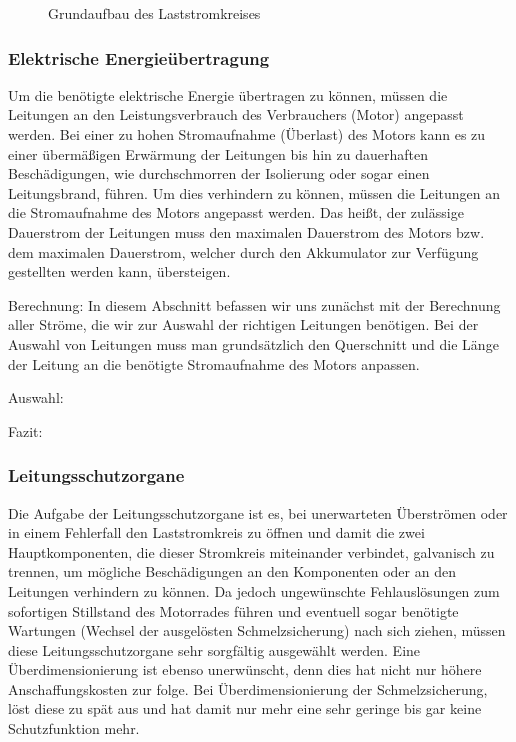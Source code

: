 \begin{figure}[H]
	\begin{center}
		\caption{Grundaufbau des Laststromkreises}
	\end{center}
\end{figure}

\newpage



\subsubsection{Elektrische Energieübertragung}
Um die benötigte elektrische Energie übertragen zu können, müssen die Leitungen an den Leistungsverbrauch des Verbrauchers (Motor) angepasst werden. Bei einer zu hohen Stromaufnahme (Überlast) des Motors kann es zu einer übermäßigen Erwärmung der Leitungen bis hin zu dauerhaften Beschädigungen, wie durchschmorren der Isolierung oder sogar einen Leitungsbrand, führen. Um dies verhindern zu können, müssen die Leitungen an die Stromaufnahme des Motors angepasst werden. Das heißt, der zulässige Dauerstrom der Leitungen muss den maximalen Dauerstrom des Motors bzw. dem maximalen Dauerstrom, welcher durch den Akkumulator zur Verfügung gestellten werden kann, übersteigen.

Berechnung:
In diesem Abschnitt befassen wir uns zunächst mit der Berechnung aller Ströme, die wir zur Auswahl der richtigen Leitungen benötigen. Bei der Auswahl von Leitungen muss man grundsätzlich den Querschnitt und die Länge der Leitung an die benötigte Stromaufnahme des Motors anpassen.

Auswahl:

Fazit:

\newpage



\subsubsection{Leitungsschutzorgane}
Die Aufgabe der Leitungsschutzorgane ist es, bei unerwarteten Überströmen oder in einem Fehlerfall den Laststromkreis zu öffnen und damit die zwei Hauptkomponenten, die dieser Stromkreis miteinander verbindet, galvanisch zu trennen, um mögliche Beschädigungen an den Komponenten oder an den Leitungen verhindern zu können. Da jedoch ungewünschte Fehlauslösungen zum sofortigen Stillstand des Motorrades führen und eventuell sogar benötigte Wartungen (Wechsel der ausgelösten Schmelzsicherung) nach sich ziehen, müssen diese Leitungsschutzorgane sehr sorgfältig ausgewählt werden. Eine Überdimensionierung ist ebenso unerwünscht, denn dies hat nicht nur höhere Anschaffungskosten zur folge. Bei Überdimensionierung der Schmelzsicherung, löst diese zu spät aus und hat damit nur mehr eine sehr geringe bis gar keine Schutzfunktion mehr. 

